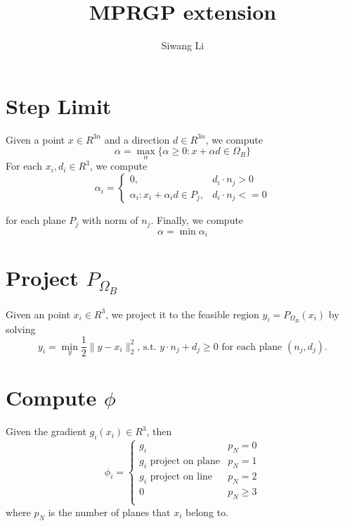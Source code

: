 \documentclass[9pt,twocolumn]{extarticle}
\author{Siwang Li}
\title{MPRGP extension}
\begin{document}
\maketitle

\setlength{\parskip}{0.5ex}

\section{Step Limit}
Given a point $x\in R^{3n}$ and a direction $d\in R^{3n}$, we compute 
\begin{equation} 
  \alpha = \max_{\alpha}\{\alpha\ge 0: x+\alpha d\in \Omega_B\}
\end{equation}
For each $x_i,d_i\in R^3$, we compute
\begin{equation}
  \alpha_i=\left\{ \begin{array}{rl}
      0, & d_i\cdot n_j > 0\\
      \alpha_i:x_i+\alpha_id \in P_j, & d_i\cdot n_j <= 0
    \end{array} \right.
\end{equation}

for each plane $P_j$ with norm of $n_j$. Finally, we compute
\begin{equation} 
  \alpha = \min \alpha_i
\end{equation}

\section{Project $P_{\Omega_B}$}
Given an point $x_i\in R^3$, we project it to the feasible region $y_i=P_{\Omega_B}(x_i)$ by solving
\begin{equation} 
  y_i = \min_{y} \frac{1}{2}\|y-x_i\|_2^2 \mbox{, s.t. }y \cdot n_j + d_j \ge 0 \mbox{ for each plane }(n_j,d_j).
\end{equation}

\section{Compute $\phi$}
Given the gradient $g_i(x_i)\in R^3$, then
\begin{equation}
  \phi_i = \left\{ \begin{array}{rl}
     g_i & p_N = 0\\
     g_i \mbox{ project on plane} & p_N = 1\\
     g_i \mbox{ project on line}& p_N = 2\\
     0 & p_N \ge 3\\
    \end{array} \right.
\end{equation}
where $p_N$ is the number of planes that $x_i$ belong to.
\end{document}
